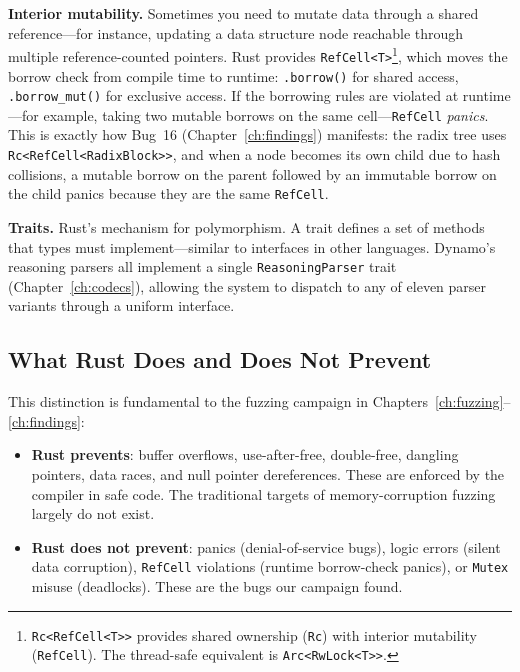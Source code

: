 \textbf{Interior mutability.}\hspace{1em} Sometimes you need to mutate data through a shared reference---for instance, updating a data structure node reachable through multiple reference-counted pointers. Rust provides \texttt{RefCell<T>}\footnote{\texttt{Rc<RefCell<T>{}>} provides shared ownership (\texttt{Rc}) with interior mutability (\texttt{RefCell}). The thread-safe equivalent is \texttt{Arc<RwLock<T>{}>}.}, which moves the borrow check from compile time to runtime: \texttt{.borrow()} for shared access, \texttt{.borrow\_mut()} for exclusive access. If the borrowing rules are violated at runtime---for example, taking two mutable borrows on the same cell---\texttt{RefCell} \emph{panics}. This is exactly how Bug~16 (Chapter~\ref{ch:findings}) manifests: the radix tree uses \texttt{Rc<RefCell<RadixBlock>{}>}, and when a node becomes its own child due to hash collisions, a mutable borrow on the parent followed by an immutable borrow on the child panics because they are the same \texttt{RefCell}.

\textbf{Traits.}\hspace{1em} Rust's mechanism for polymorphism. A trait defines a set of methods that types must implement---similar to interfaces in other languages. Dynamo's reasoning parsers all implement a single \texttt{ReasoningParser} trait (Chapter~\ref{ch:codecs}), allowing the system to dispatch to any of eleven parser variants through a uniform interface.

\subsection{What Rust Does and Does Not Prevent}

This distinction is fundamental to the fuzzing campaign in Chapters~\ref{ch:fuzzing}--\ref{ch:findings}:
\begin{itemize}
  \item \textbf{Rust prevents}: buffer overflows, use-after-free, double-free, dangling pointers, data races, and null pointer dereferences. These are enforced by the compiler in safe code. The traditional targets of memory-corruption fuzzing largely do not exist.
  \item \textbf{Rust does not prevent}: panics (denial-of-service bugs), logic errors (silent data corruption), \texttt{RefCell} violations (runtime borrow-check panics), or \texttt{Mutex} misuse (deadlocks). These are the bugs our campaign found.
\end{itemize}

